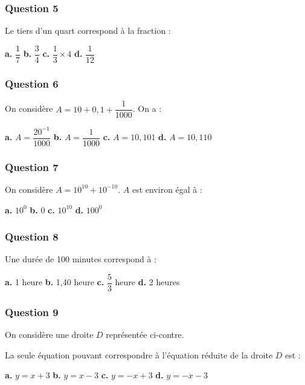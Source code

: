 \documentclass[10pt]{article}
\begin{document}
\subsubsection*{Question 5}
Le tiers d'un quart correspond à la fraction :

\textbf{a.} $\dfrac{1}{7}$ \hfill \textbf{b.} $\dfrac{3}{4}$ \hfill \textbf{c.} $\dfrac{1}{3} \times 4$ \hfill \textbf{d.} $\dfrac{1}{12}$

\subsubsection*{Question 6}
On considère $A = 10 + 0,1 + \dfrac{1}{1000}$. On a :

\textbf{a.} $A = \dfrac{20^{- 1}}{1000}$ \hfill \textbf{b.} $A = \dfrac{1}{1000}$ \hfill 
\textbf{c.} $A = 10,101$ \hfill \textbf{d.} $A = 10,110$

\subsubsection*{Question 7}
On considère $A = 10^{10} + 10^{-10}$. $A$ est environ égal à :

\textbf{a.} $10^0$ \hfill \textbf{b.} $0$ \hfill \textbf{c.} $10^{10}$ \hfill \textbf{d.} $100^0$

\subsubsection*{Question 8}
Une durée de 100 minutes correspond à :

\textbf{a.} 1 heure \hfill \textbf{b.} 1,40 heure \hfill 
\textbf{c.} $\dfrac{5}{3}$ heure \hfill \textbf{d.} 2 heures

\bigskip

\begin{minipage}[t]{0.7\textwidth}
\subsubsection*{Question 9}
On considère une droite $D$ représentée ci-contre.

La seule équation pouvant correspondre à l'équation réduite de la droite $D$ est :

\textbf{a.} $y = x + 3$ \hfill \textbf{b.} $y = x - 3$ \hfill 
\textbf{c.} $y = -x + 3$ \hfill \textbf{d.} $y = -x - 3$
\end{minipage}
\hfill
\begin{minipage}[t]{0.29\textwidth}
\vspace{0pt}
\begin{center}
\end{center}
\end{minipage}
\end{document}
